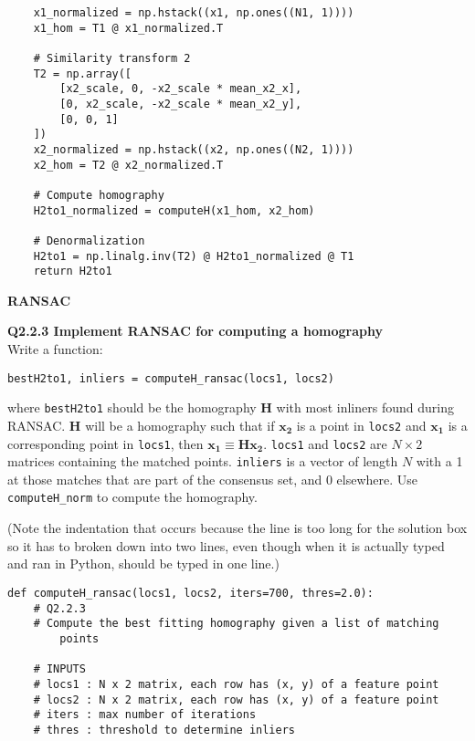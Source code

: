 \documentclass[12pt,letterpaper, onecolumn]{exam}
\begin{document}
\begin{questions}
\begin{solution}
\begin{verbatim}
    x1_normalized = np.hstack((x1, np.ones((N1, 1))))
    x1_hom = T1 @ x1_normalized.T
    
    # Similarity transform 2
    T2 = np.array([
        [x2_scale, 0, -x2_scale * mean_x2_x],
        [0, x2_scale, -x2_scale * mean_x2_y],
        [0, 0, 1]
    ])
    x2_normalized = np.hstack((x2, np.ones((N2, 1))))
    x2_hom = T2 @ x2_normalized.T
 
    # Compute homography
    H2to1_normalized = computeH(x1_hom, x2_hom)
    
    # Denormalization
    H2to1 = np.linalg.inv(T2) @ H2to1_normalized @ T1
    return H2to1
        \end{verbatim}
    \end{solution}

    \pagebreak

    \begingroup
    \large \textbf{RANSAC}
    \endgroup

    \question \textbf{Q2.2.3 Implement RANSAC for computing a homography} \\

    Write a function:
    \begin{center}
        \texttt{bestH2to1, inliers = computeH\_ransac(locs1, locs2)}
    \end{center}

    where \texttt{bestH2to1} should be the homography \(\mathbf{H}\) with most inliners found during RANSAC. \(\mathbf{H}\) will be a homography such that if \(\mathbf{x_2}\) is a point in \texttt{locs2} and \(\mathbf{x_1}\) is a corresponding point in \texttt{locs1}, then \(\mathbf{x_1} \equiv \mathbf{Hx_2}\). \texttt{locs1} and \texttt{locs2} are $N \times 2$ matrices containing the matched points. \texttt{inliers} is a vector of length $N$ with a 1 at those matches that are part of the consensus set, and 0 elsewhere. Use \texttt{computeH\_norm} to compute the homography.

    \begin{solution}
        (Note the indentation that occurs because the line is too long for the solution box so it has to broken down into two lines, even though when it is actually typed and ran in Python, should be typed in one line.)
        \begin{verbatim}
def computeH_ransac(locs1, locs2, iters=700, thres=2.0):
    # Q2.2.3
    # Compute the best fitting homography given a list of matching
        points
    
    # INPUTS
    # locs1 : N x 2 matrix, each row has (x, y) of a feature point
    # locs2 : N x 2 matrix, each row has (x, y) of a feature point
    # iters : max number of iterations
    # thres : threshold to determine inliers
    

\end{verbatim}
\end{solution}
\end{questions}
\end{document}
